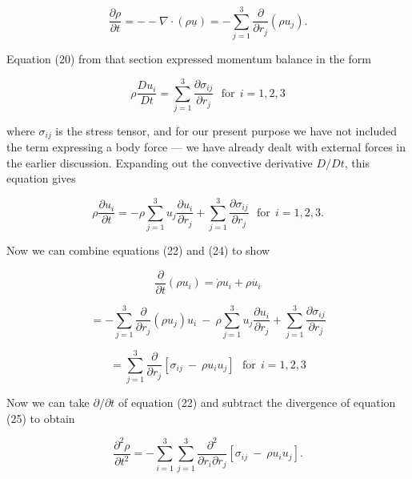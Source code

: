   \begin{equation*}\dfrac{\partial \rho}{\partial t} = -- \nabla \cdot (\rho 
  \underline{u}) = -\sum_{j=1}^3\dfrac{\partial}{\partial r_j} \left( \rho u_j 
  \right) . \tag{22}\end{equation*} 

  Equation (20) from that section expressed momentum balance in the form 

  \begin{equation*}\rho \dfrac{Du_i}{Dt}=\sum_{j=1}^3{\dfrac{\partial 
  \sigma_{ij}}{\partial r_j}}\mathrm{~~~for~~}i=1,2,3 \tag{23}\end{equation*} 

  \noindent{}where $\sigma_{ij}$ is the stress tensor, and for our present 
  purpose we have not included the term expressing a body force --- we have 
  already dealt with external forces in the earlier discussion. Expanding out 
  the convective derivative $D/Dt$, this equation gives 

  \begin{equation*}\rho \dfrac{\partial u_i}{\partial t}=- \rho 
  \sum_{j=1}^3{u_j \dfrac{\partial u_i}{\partial r_j}} + 
  \sum_{j=1}^3{\dfrac{\partial \sigma_{ij}}{\partial 
  r_j}}\mathrm{~~~for~~}i=1,2,3 . \tag{24}\end{equation*} 

  Now we can combine equations (22) and (24) to show 

  \begin{equation*}\dfrac{\partial}{\partial t}(\rho u_i) =\dot{\rho} u_i + 
  \rho \dot{u_i}\end{equation*} 

  \begin{equation*}= -\sum_{j=1}^3\dfrac{\partial}{\partial r_j} \left( \rho 
  u_j \right) u_i \mathrm{~}-\mathrm{~} \rho \sum_{j=1}^3{u_j \dfrac{\partial 
  u_i}{\partial r_j}} + \sum_{j=1}^3{\dfrac{\partial \sigma_{ij}}{\partial 
  r_j}}\end{equation*} 

  \begin{equation*}= \sum_{j=1}^3 \dfrac{\partial}{\partial r_j} 
  \left[\sigma_{ij} \mathrm{~}-\mathrm{~} \rho u_i u_j \right] 
  \mathrm{~~~for~~}i=1,2,3 \tag{25}\end{equation*} 

  Now we can take $\partial/\partial t$ of equation (22) and subtract the 
  divergence of equation (25) to obtain 

  \begin{equation*}\dfrac{\partial^2 \rho}{\partial t^2} = -\sum_{i=1}^3 
  \sum_{j=1}^3 \dfrac{\partial^2}{\partial r_i \partial r_j} \left[\sigma_{ij} 
  \mathrm{~}-\mathrm{~} \rho u_i u_j \right] . \tag{26}\end{equation*} 

